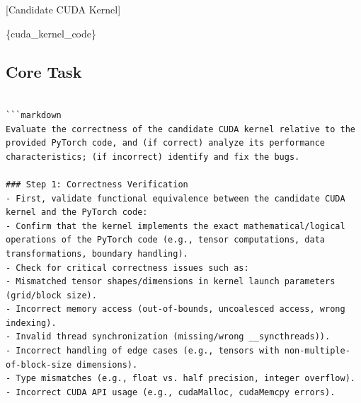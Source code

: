 \documentclass[
  10
]{article}
\newenvironment{Shaded}{}{}
\newcommand{\NormalTok}[1]{#1}
\newcommand{\OperatorTok}[1]{\textcolor[rgb]{0.40,0.40,0.40}{#1}}
\begin{document}
{[}Candidate CUDA Kernel{]}

\begin{Shaded}
\begin{Highlighting}[]
\OperatorTok{\{}\NormalTok{cuda\_kernel\_code}\OperatorTok{\}}
\end{Highlighting}
\end{Shaded}

\subsection{Core Task}\label{core-task}

\begin{verbatim}

```markdown
Evaluate the correctness of the candidate CUDA kernel relative to the provided PyTorch code, and (if correct) analyze its performance characteristics; (if incorrect) identify and fix the bugs.

### Step 1: Correctness Verification
- First, validate functional equivalence between the candidate CUDA kernel and the PyTorch code:
- Confirm that the kernel implements the exact mathematical/logical operations of the PyTorch code (e.g., tensor computations, data transformations, boundary handling).
- Check for critical correctness issues such as:
- Mismatched tensor shapes/dimensions in kernel launch parameters (grid/block size).
- Incorrect memory access (out-of-bounds, uncoalesced access, wrong indexing).
- Invalid thread synchronization (missing/wrong __syncthreads)).
- Incorrect handling of edge cases (e.g., tensors with non-multiple-of-block-size dimensions).
- Type mismatches (e.g., float vs. half precision, integer overflow).
- Incorrect CUDA API usage (e.g., cudaMalloc, cudaMemcpy errors).


\end{verbatim}
\end{document}

